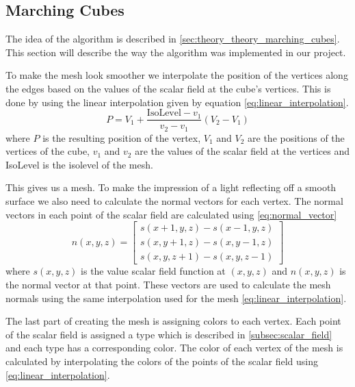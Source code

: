 \subsection{Marching Cubes} \label{subsec:marching_cubes}
The idea of the algorithm is described in \autoref{sec:theory_theory_marching_cubes}.
This section will describe the way the algorithm was implemented in our project.

To make the mesh look smoother we interpolate the position of the vertices along the edges based on the values of the scalar field at the cube's vertices.
This is done by using the linear interpolation given by equation \autoref{eq:linear_interpolation}.
\begin{equation}
  \label{eq:linear_interpolation}
  P = V_1 + \frac{\text{IsoLevel} - v_1}{v_2 - v_1} (V_2 - V_1)
\end{equation}
where $P$ is the resulting position of the vertex, $V_1$ and $V_2$ are the positions of the vertices of the cube, $v_1$ and $v_2$ are the values of the scalar field at the vertices and IsoLevel is the isolevel of the mesh.

This gives us a mesh.
To make the impression of a light reflecting off a smooth surface we also need to calculate the normal vectors for each vertex.
The normal vectors in each point of the scalar field are calculated using \autoref{eq:normal_vector}
\begin{equation}
  \label{eq:normal_vector}
  n(x, y, z) = \begin{bmatrix}
    s(x + 1, y, z) - s(x - 1, y, z) \\
    s(x, y + 1, z) - s(x, y - 1, z) \\
    s(x, y, z + 1) - s(x, y, z - 1)
  \end{bmatrix}
\end{equation}
where $s(x, y, z)$ is the value scalar field function at $(x,y,z)$ and $n(x, y, z)$ is the normal vector at that point.
These vectors are used to calculate the mesh normals using the same interpolation used for the mesh \autoref{eq:linear_interpolation}.

The last part of creating the mesh is assigning colors to each vertex.
Each point of the scalar field is assigned a type which is described in \autoref{subsec:scalar_field} and each type has a corresponding color.
The color of each vertex of the mesh is calculated by interpolating the colors of the points of the scalar field using \autoref{eq:linear_interpolation}.